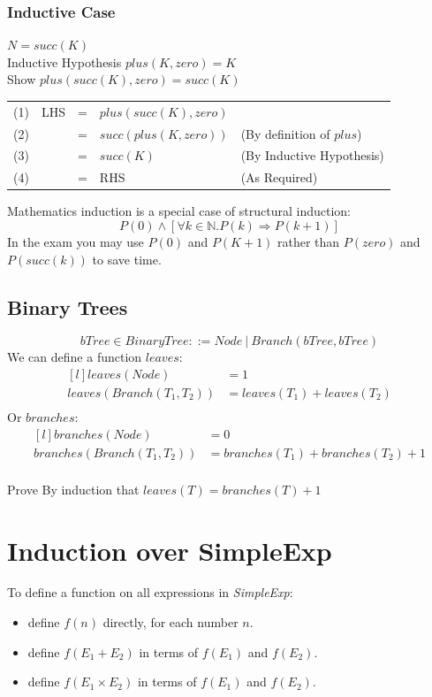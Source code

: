 \subsubsection*{Inductive Case}
$N = succ(K)$
\\ Inductive Hypothesis $plus(K, zero) = K$
\\ Show $plus(succ(K), zero) = succ(K)$
\begin{center}
    \begin{tabular}{c r c l l}
        (1) & LHS & = & $plus(succ(K), zero)$                             \\
        (2) &     & = & $succ(plus(K, zero))$ & (By definition of $plus$) \\
        (3) &     & = & $succ(K)$             & (By Inductive Hypothesis) \\
        (4) &     & = & RHS                   & (As Required)             \\
    \end{tabular}
\end{center}
\noindent 
Mathematics induction is a special case of structural induction:
\[P(0) \land [\forall k \in \mathbb{N}. P(k) \Rightarrow P(k + 1)]\]
In the exam you may use $P(0)$ and $P(K+1)$ rather than $P(zero)$ and $P(succ(k))$ to save time.

\subsection{Binary Trees}
\[bTree \in BinaryTree ::= Node \ | \ Branch(bTree, bTree)\]
We can define a function $leaves$:
\[\begin{matrix*}[l]
    leaves(Node) & = 1 \\
    leaves(Branch(T_1, T_2)) & = leaves(T_1) + leaves(T_2) \\
\end{matrix*}\]
Or $branches$:
\[\begin{matrix*}[l]
    branches(Node) & = 0 \\
    branches(Branch(T_1,T_2)) & = branches(T_1) + branches(T_2) + 1 \\    
\end{matrix*}\]
    
\begin{examplebox}
    Prove By induction that $leaves(T) = branches(T) + 1$
    \tcblower
    \unfinished
\end{examplebox}

\section{Induction over SimpleExp}
To define a function on all expressions in \textit{SimpleExp}:
\begin{itemize}
	\item define $f(n)$ directly, for each number $n$.
	\item define $f(E_1 + E_2)$ in terms of $f(E_1)$ and $f(E_2)$.
	\item define $f(E_1 \times E_2)$ in terms of $f(E_1)$ and $f(E_2)$.
\end{itemize}

